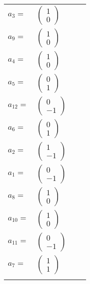 \documentclass[1p]{elsarticle_modified}
\theoremstyle{definition}
\begin{document}
\begin{tabular}{m{7pt} m{180pt} m{7pt} m{180pt} }
\flushright $a_{3}=$&$\begin{pmatrix}1\\0\end{pmatrix}$ \\
\flushright $a_{9}=$&$\begin{pmatrix}1\\0\end{pmatrix}$ \\
\flushright $a_{4}=$&$\begin{pmatrix}1\\0\end{pmatrix}$ \\
\flushright $a_{5}=$&$\begin{pmatrix}0\\1\end{pmatrix}$ \\
\flushright $a_{12}=$&$\begin{pmatrix}0\\-1\end{pmatrix}$ \\
\flushright $a_{6}=$&$\begin{pmatrix}0\\1\end{pmatrix}$ \\
\flushright $a_{2}=$&$\begin{pmatrix}1\\-1\end{pmatrix}$ \\
\flushright $a_{1}=$&$\begin{pmatrix}0\\-1\end{pmatrix}$ \\
\flushright $a_{8}=$&$\begin{pmatrix}1\\0\end{pmatrix}$ \\
\flushright $a_{10}=$&$\begin{pmatrix}1\\0\end{pmatrix}$ \\
\flushright $a_{11}=$&$\begin{pmatrix}0\\-1\end{pmatrix}$ \\
\flushright $a_{7}=$&$\begin{pmatrix}1\\1\end{pmatrix}$\\&\end{tabular}
\end{document}

